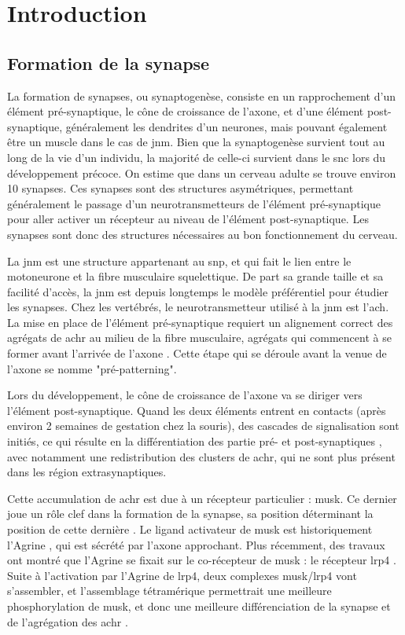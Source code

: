 \chapter{Introduction}

\section{Formation de la synapse}
	\label{sec:IntroSynapse}
	La formation de synapses, ou synaptogenèse, consiste en un rapprochement d'un élément pré-synaptique, le cône de croissance de l'axone, et d'une élément post-synaptique, généralement les dendrites d'un neurones, mais pouvant également être un muscle dans le cas de \gls{jnm}. Bien que la synaptogenèse survient tout au long de la vie d'un individu, la majorité de celle-ci survient dans le \gls{snc} lors du développement précoce. On estime que dans un cerveau adulte se trouve environ 10	synapses. Ces synapses sont des structures asymétriques, permettant généralement le passage d'un neurotransmetteurs de l'élément pré-synaptique pour aller activer un récepteur au niveau de l'élément post-synaptique. Les synapses sont donc des structures nécessaires au bon fonctionnement du cerveau. 
	
	La \gls{jnm} est une structure appartenant au \gls{snp}, et qui fait le lien entre le motoneurone et la fibre musculaire squelettique. De part sa grande taille et sa facilité d'accès, la \gls{jnm} est depuis longtemps le modèle préférentiel pour étudier les synapses. Chez les vertébrés, le neurotransmetteur utilisé à la \gls{jnm} est l'\gls{ach}. La mise en place de l'élément pré-synaptique requiert un alignement correct des agrégats de \gls{achr} au milieu de la fibre musculaire, agrégats qui commencent à se former avant l'arrivée de l'axone \cite{Wu2010a, Gordon2012}. Cette étape qui se déroule avant la venue de l'axone se nomme "pré-patterning".
	
	Lors du développement, le cône de croissance de l'axone va se diriger vers l'élément post-synaptique. Quand les deux éléments entrent en contacts (après environ 2 semaines de gestation chez la souris), des cascades de signalisation sont initiés, ce qui résulte en la différentiation des partie pré- et post-synaptiques \cite{Sanes1999}, avec notamment une redistribution des clusters de \gls{achr}, qui ne sont plus présent dans les région extrasynaptiques.
	
	Cette accumulation de \gls{achr} est due à un récepteur particulier : \gls{musk}. Ce dernier joue un rôle clef dans la formation de la synapse, sa position déterminant la position de cette dernière \cite{DeChiara1996, Glass1996}. Le ligand activateur de \gls{musk} est historiquement l'Agrine \cite{Glass1996}, qui est sécrété par l'axone approchant. Plus récemment, des travaux ont montré que l'Agrine se fixait sur le co-récepteur de \gls{musk} : le récepteur \gls{lrp4} \cite{Zhang2008, Kim2008}. Suite à l'activation par l'Agrine de \gls{lrp4}, deux complexes \gls{musk}/\gls{lrp4} vont s'assembler, et l'assemblage tétramérique permettrait une meilleure phosphorylation de \gls{musk}, et donc une meilleure différenciation de la synapse et de l'agrégation des \gls{achr} \cite{Zong2012}.
	\clearpage
	
